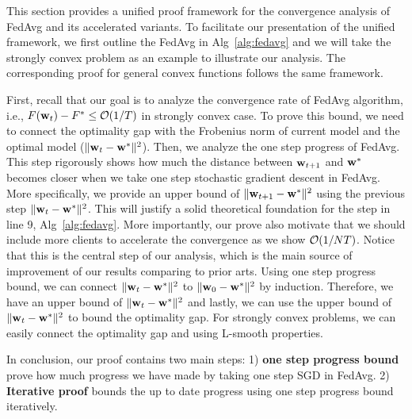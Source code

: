 This section provides a unified proof framework for the convergence analysis of FedAvg and its accelerated variants. To facilitate our presentation of the unified framework,
we first outline the FedAvg in Alg~\ref{alg:fedavg} and we will take 
the strongly convex problem as an example to illustrate our analysis. 
The corresponding proof for general convex functions follows the 
same framework.  

First, recall that our goal is to analyze the convergence rate of FedAvg algorithm, i.e., $F({\mathbf{w}}_t) - F^* \leq {\mathcal{O}}(1/T)$ in strongly convex 
case. 
To prove this bound, we need to connect the optimality gap with the Frobenius norm
of current model and the optimal model ($\| {\mathbf{w}}_t - {\mathbf{w}}^*\|^2$). Then, we 
analyze the one step progress of FedAvg. This step rigorously shows how 
much the distance between ${\mathbf{w}}_{t+1}$ and ${\mathbf{w}}^*$ becomes closer when 
we take one step stochastic gradient descent in FedAvg. More specifically,
we provide an upper bound of $\|{\mathbf{w}}_{t+1} - {\mathbf{w}}^*\|^2$ using the previous
step $\| {\mathbf{w}}_t - {\mathbf{w}}^*\|^2$. This will justify a solid theoretical foundation for the step in line 9, Alg~\ref{alg:fedavg}. More importantly, our 
prove also motivate that we should include more clients to accelerate the
convergence as we show ${\mathcal{O}}(1/NT)$.  Notice that this is the central step of our analysis, which is the main source of improvement of our results comparing to 
prior arts. 
Using one step progress bound, we can connect $\|{\mathbf{w}}_t - {\mathbf{w}}^*\|^2$ to 
$\|{\mathbf{w}}_0 - {\mathbf{w}}^*\|^2$ by induction. Therefore, we have an upper bound
of $\|{\mathbf{w}}_t - {\mathbf{w}}^*\|^2$ and lastly, we can use the upper bound
of $\|{\mathbf{w}}_t - {\mathbf{w}}^*\|^2$ to bound the optimality gap. 
For strongly convex problems, we can easily connect the optimality gap
and using L-smooth properties. 

In conclusion, our proof contains two main steps: 1) \textbf{one step progress bound} prove how much progress we have made by taking one step
SGD in FedAvg. 2) \textbf{Iterative proof} bounds the up to date progress using one step progress bound iteratively. 


